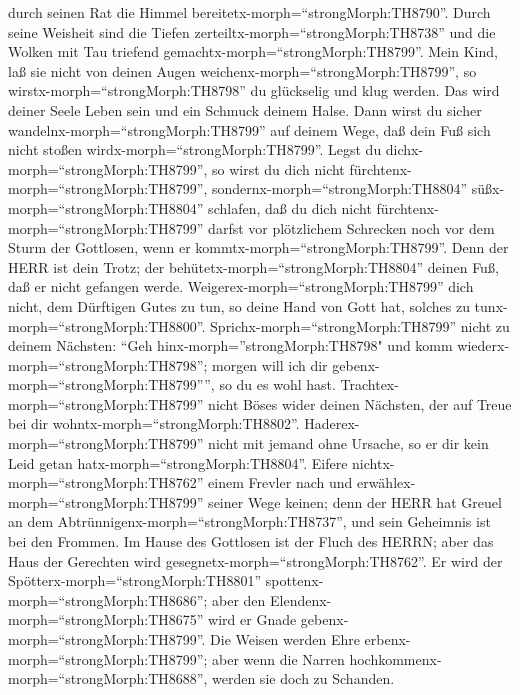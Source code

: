 durch seinen Rat die Himmel bereitetx-morph=``strongMorph:TH8790''.
 Durch seine Weisheit sind die Tiefen
zerteiltx-morph=``strongMorph:TH8738'' und die Wolken mit Tau triefend
gemachtx-morph=``strongMorph:TH8799''.  Mein Kind, laß sie
nicht von deinen Augen weichenx-morph=``strongMorph:TH8799'', so
wirstx-morph=``strongMorph:TH8798'' du glückselig und klug werden.
 Das wird deiner Seele Leben sein und ein Schmuck deinem
Halse.  Dann wirst du sicher
wandelnx-morph=``strongMorph:TH8799'' auf deinem Wege, daß dein Fuß sich
nicht stoßen wirdx-morph=``strongMorph:TH8799''.  Legst du
dichx-morph=``strongMorph:TH8799'', so wirst du dich nicht
fürchtenx-morph=``strongMorph:TH8799'',
sondernx-morph=``strongMorph:TH8804'' süßx-morph=``strongMorph:TH8804''
schlafen,  daß du dich nicht
fürchtenx-morph=``strongMorph:TH8799'' darfst vor plötzlichem Schrecken
noch vor dem Sturm der Gottlosen, wenn er
kommtx-morph=``strongMorph:TH8799''.  Denn der HERR ist
dein Trotz; der behütetx-morph=``strongMorph:TH8804'' deinen Fuß, daß er
nicht gefangen werde. 
Weigerex-morph=``strongMorph:TH8799'' dich nicht, dem Dürftigen Gutes zu
tun, so deine Hand von Gott hat, solches zu
tunx-morph=``strongMorph:TH8800''. 
Sprichx-morph=``strongMorph:TH8799'' nicht zu deinem Nächsten: ``Geh
hinx-morph=''strongMorph:TH8798" und komm
wiederx-morph=``strongMorph:TH8798''; morgen will ich dir
gebenx-morph=``strongMorph:TH8799'''', so du es wohl hast. 
Trachtex-morph=``strongMorph:TH8799'' nicht Böses wider deinen Nächsten,
der auf Treue bei dir wohntx-morph=``strongMorph:TH8802''. 
Haderex-morph=``strongMorph:TH8799'' nicht mit jemand ohne Ursache, so
er dir kein Leid getan hatx-morph=``strongMorph:TH8804''. 
Eifere nichtx-morph=``strongMorph:TH8762'' einem Frevler nach und
erwählex-morph=``strongMorph:TH8799'' seiner Wege keinen; 
denn der HERR hat Greuel an dem
Abtrünnigenx-morph=``strongMorph:TH8737'', und sein Geheimnis ist bei
den Frommen.  Im Hause des Gottlosen ist der Fluch des
HERRN; aber das Haus der Gerechten wird
gesegnetx-morph=``strongMorph:TH8762''.  Er wird der
Spötterx-morph=``strongMorph:TH8801''
spottenx-morph=``strongMorph:TH8686''; aber den
Elendenx-morph=``strongMorph:TH8675'' wird er Gnade
gebenx-morph=``strongMorph:TH8799''.  Die Weisen werden
Ehre erbenx-morph=``strongMorph:TH8799''; aber wenn die Narren
hochkommenx-morph=``strongMorph:TH8688'', werden sie doch zu Schanden.

